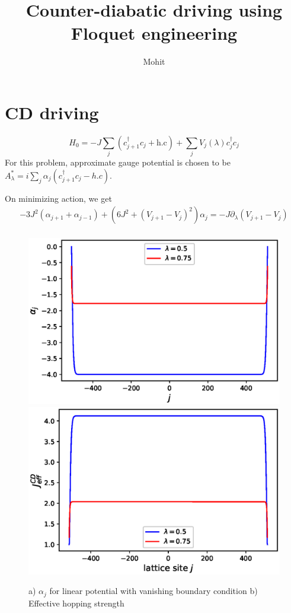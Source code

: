 \documentclass[11pt,a4paper]{article}
\author{Mohit}
\title{Counter-diabatic driving using Floquet engineering}
\begin{document}
\maketitle

\section{CD driving}
 \begin{equation}
 H_0= - J \sum_j (c^{\dagger}_{j+1} c_j+ \mbox{h.c}) + \sum_j V_j (\lambda) c^{\dagger}_{j} c_j
 \end{equation}
For this problem, approximate gauge potential is chosen to be $A_{\lambda}^*= i \sum_j \alpha_j (c^{\dagger}_{j+1} c_j- h.c)$.

On minimizing action, we get 
\begin{align*}
-3 J^2 (\alpha_{j+1}+ \alpha_{j-1})+ (6 J^2 + (V_{j+1}- V_{j})^2) \alpha_j= - J \partial_{\lambda} (V_{j+1}- V_{j}) \\
\end{align*}


\begin{figure}[!ht]
\begin{center}
\includegraphics[scale=0.5]{pics/alpha_j_linear_potn.eps}
\includegraphics[scale=0.5]{pics/j_eff_cd.eps}\\
\caption{a) $\alpha_j$ for linear potential with vanishing boundary condition b) Effective hopping strength}
\end{center}
\end{figure}
\end{document}
